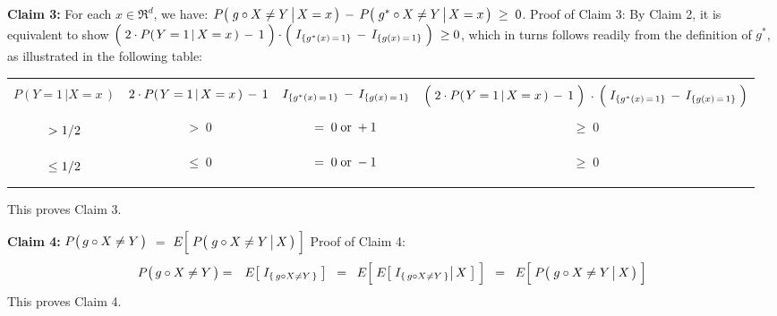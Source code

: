 \vskip 0.8cm
\noindent
\textbf{Claim 3:}\; For each $x \in \Re^{d}$, we have:
$P\!\left(\,\left. g \overset{{\color{white}.}}{\circ} X \neq Y \,\right\vert X = x \,\right)
\, - \,
P\!\left(\,\left. g^{*} \overset{{\color{white}.}}{\circ} X \neq Y \,\right\vert X = x \,\right) \; \geq \; 0$.
\vskip 0.1cm
\noindent
Proof of Claim 3:\;
By Claim 2, it is equivalent to show
$\left(\; 2 \cdot P\!\left(\left.Y=1\,\right\vert X =x \,\right) \,\overset{{\color{white}.}}{-}\, 1 \;\right)
\cdot
\left(\; I_{\{g^{*}(x)\,=\,1\}} \,\overset{{\color{white}.}}{-}\, I_{\{g(x)\,=\,1\}} \;\right) \; \geq 0$,
which in turns follows readily from the definition of $g^{*}$, as illustrated in the following table:
{\footnotesize
\begin{center}
\begin{tabular}{|c||c|c|c|}
\hline
&&&\\
	$P\!\left(\left.Y=1\,\right\vert X =x \,\right)$ &
	$2 \cdot P\!\left(\left.Y=1\,\right\vert X =x \,\right) \,\overset{{\color{white}.}}{-}\, 1$ &
	$I_{\{g^{*}(x)\,=\,1\}} \,\overset{{\color{white}.}}{-}\, I_{\{g(x)\,=\,1\}}$ &
	$\left(\; 2 \cdot P\!\left(\left.Y=1\,\right\vert X =x \,\right) \,\overset{{\color{white}.}}{-}\, 1 \;\right)$
	$\cdot$
	$\left(\; I_{\{g^{*}(x)\,=\,1\}} \,\overset{{\color{white}.}}{-}\, I_{\{g(x)\,=\,1\}} \;\right)$
\\
&&&\\
\hline
	$\underset{{\color{white}-}}{\overset{{\color{white}-}}{>} 1/2}$ &
	$ >\; 0 $ &
	$ =\; 0 \;\textnormal{or}\; +1$ &
	$ \geq\; 0 $
\\
\hline
	$\underset{{\color{white}-}}{\overset{{\color{white}-}}{\leq} 1/2}$ &
	$ \leq\; 0$ &
	$ =\; 0 \;\textnormal{or}\; -1$ &
	$ \geq\; 0 $
\\
\hline
\end{tabular}
\end{center}
}
\noindent
This proves Claim 3.

\vskip 0.8cm
\noindent
\textbf{Claim 4:}\;
$P\!\left(\,g\overset{{\color{white}.}}{\circ}X \neq Y\,\right)$
\;$=$\;
$E\!\left[\;\overset{{\color{white}.}}{P}\!\left(\,\left. g \overset{{\color{white}.}}{\circ} X \neq Y \,\right\vert X \,\right)\;\right]$
\vskip 0.1cm
\noindent
Proof of Claim 4:\;
\begin{eqnarray*}
P\!\left(\,g\overset{{\color{white}.}}{\circ}X \neq Y\,\right)
&=&
	E\!\left[\; I_{\{\,g \circ X \neq Y\,\}} \;\right]
\;\; = \;\;
	E\!\left[\; \overset{{\color{white}.}}{E}\!\left[\, \left. I_{\{\,g \circ X \neq Y\,\}} \right\vert X \;\right] \;\right]
\;\; = \;\;
	E\!\left[\;\overset{{\color{white}.}}{P}\!\left(\,\left. g \overset{{\color{white}.}}{\circ} X \neq Y \,\right\vert X \,\right)\;\right]
\end{eqnarray*}
This proves Claim 4.

